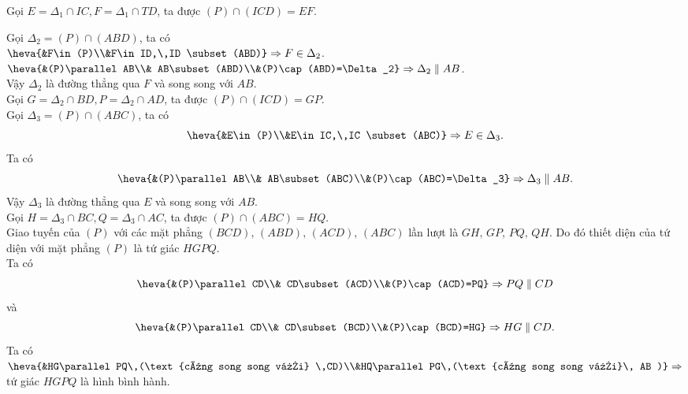 \begin{bt}
{\begin{listEX}
			Gọi $E=\Delta_1 \cap IC, F=\Delta_1 \cap TD$, ta được $(P)\cap (ICD)=EF$.
			\item 	
			Gọi $\Delta_2=(P)\cap(ABD)$, ta có\\
			$\heva{&F\in (P)\\&F\in ID,\,ID \subset (ABD)}\Rightarrow F \in \Delta_2$.\\
			$\heva{&(P)\parallel AB\\& AB\subset (ABD)\\&(P)\cap (ABD)=\Delta_2}\Rightarrow \Delta_2 \parallel AB$.\\
			Vậy $\Delta_2$ là đường thẳng qua $F$ và song song với $AB$.\\
			Gọi $G=\Delta_2 \cap BD, P=\Delta_2 \cap AD$, ta được $(P)\cap (ICD)=GP$.\\
			Gọi $\Delta_3=(P)\cap(ABC)$, ta có
			$$\heva{&E\in (P)\\&E\in IC,\,IC \subset (ABC)}\Rightarrow E \in \Delta_3.$$
			Ta có $$\heva{&(P)\parallel AB\\& AB\subset (ABC)\\&(P)\cap (ABC)=\Delta_3}\Rightarrow \Delta_3 \parallel AB.$$
			Vậy $\Delta_3$ là đường thẳng qua $E$ và song song với $AB$.\\
			Gọi $H=\Delta_3 \cap BC, Q=\Delta_3 \cap AC$, ta được $(P)\cap (ABC)=HQ$.\\
			Giao tuyến của $(P)$ với các mặt phẳng $(BCD),\,(ABD),\,(ACD),\,(ABC)$ lần lượt là $GH,\,GP,\,PQ,\,QH$. Do đó thiết diện của tứ diện với mặt phẳng $(P)$ là tứ giác $HGPQ$.\\
			Ta có
			$$\heva{&(P)\parallel CD\\& CD\subset (ACD)\\&(P)\cap (ACD)=PQ}\Rightarrow PQ \parallel CD$$
			và
			$$\heva{&(P)\parallel CD\\& CD\subset (BCD)\\&(P)\cap (BCD)=HG}\Rightarrow HG \parallel CD.$$
			Ta có $\heva{&HG\parallel PQ\,(\text{cùng song song với} \,CD)\\&HQ\parallel PG\,(\text{cùng song song với}\, AB )}\Rightarrow $ tứ giác $HGPQ$ là hình bình hành.
		\end{listEX}
	}
\end{bt}
